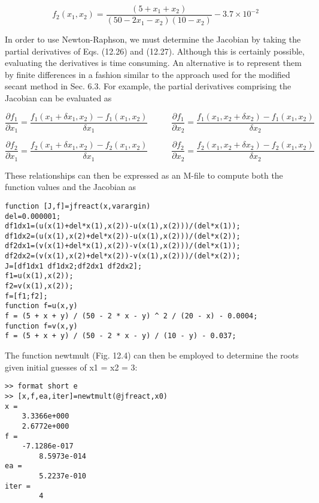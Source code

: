 \documentclass[../main.tex]{subfiles}
\begin{document}
\begin{equation}
f_{2}(x_{1},x_{2})=\frac{(5+x_{1}+x_{2})}{(50-2x_{1}-x_{2})(10-x_{2})}-3.7 \times10^{-2}
\tag{12.27}
\end{equation}

In order to use Newton-Raphson, we must determine the Jacobian by taking the partial
derivatives of Eqs. (12.26) and (12.27). Although this is certainly possible, evaluating the
derivatives is time consuming. An alternative is to represent them by finite differences in a
fashion similar to the approach used for the modified secant method in Sec. 6.3. For example, the partial derivatives comprising the Jacobian can be evaluated as

\begin{equation}
\frac{\partial f_{1}}{\partial x_{1}}=\frac{f_{1}(x_{1}+\delta x_{1},x_{2})-f_{1}(x_{1},x_{2})}{\delta x_{1}}
\; \; \; \; \; \; \; \; \; \;
\frac{\partial f_{1}}{\partial x_{2}}=\frac{f_{1}(x_{1}, x_{2}+\delta x_{2})-f_{1}(x_{1},x_{2})}{\delta x_{2}}
\end{equation}

\begin{equation}
\frac{\partial f_{2}}{\partial x_{1}}=\frac{f_{2}(x_{1}+\delta x_{1},x_{2})-f_{2}(x_{1},x_{2})}{\delta x_{1}}
\; \; \; \; \; \; \; \; \; \;
\frac{\partial f_{2}}{\partial x_{2}}=\frac{f_{2}(x_{1}, x_{2}+\delta x_{2})-f_{2}(x_{1},x_{2})}{\delta x_{2}}
\end{equation}

These relationships can then be expressed as an M-file to compute both the function
values and the Jacobian as

\begin{lstlisting}[numbers=none]
function [J,f]=jfreact(x,varargin)
del=0.000001;
df1dx1=(u(x(1)+del*x(1),x(2))-u(x(1),x(2)))/(del*x(1));
df1dx2=(u(x(1),x(2)+del*x(2))-u(x(1),x(2)))/(del*x(2));
df2dx1=(v(x(1)+del*x(1),x(2))-v(x(1),x(2)))/(del*x(1));
df2dx2=(v(x(1),x(2)+del*x(2))-v(x(1),x(2)))/(del*x(2));
J=[df1dx1 df1dx2;df2dx1 df2dx2];
f1=u(x(1),x(2));
f2=v(x(1),x(2));
f=[f1;f2];
function f=u(x,y)
f = (5 + x + y) / (50 - 2 * x - y) ^ 2 / (20 - x) - 0.0004;
function f=v(x,y)
f = (5 + x + y) / (50 - 2 * x - y) / (10 - y) - 0.037;
\end{lstlisting}

The function newtmult (Fig. 12.4) can then be employed to determine the roots given initial guesses of x1 = x2 = 3:
\begin{lstlisting}[numbers=none]
>> format short e
>> [x,f,ea,iter]=newtmult(@jfreact,x0)
x =
	3.3366e+000
	2.6772e+000
f =
	-7.1286e-017
		8.5973e-014
ea =
		5.2237e-010
iter =
		4
\end{lstlisting}
\end{document}
